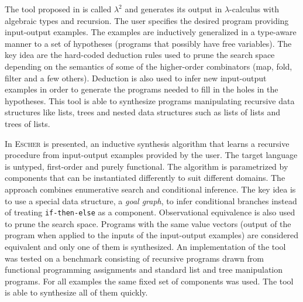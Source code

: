 The tool proposed in \cite{Feser:2015:SDS:2737924.2737977} is called $\lambda^2$ and generates its output in $\lambda$-calculus with algebraic types and recursion.
The user specifies the desired program providing input-output examples.  
The examples are inductively generalized in a type-aware manner to a set of hypotheses (programs that possibly have free variables).
The key idea are the hard-coded deduction rules used to prune the search space depending on the semantics of some of the higher-order combinators (map, fold, filter and a few others).
Deduction is also used to infer new input-output examples in order to generate the programs needed to fill in the holes in the hypotheses.
This tool is able to synthesize programs manipulating recursive data structures like lists, trees and nested data structures such as lists of lists and trees of lists.

In \cite{Albarghouthi:2013:RPS:2526861.2526942} \textsc{Escher} is presented, an inductive synthesis algorithm that learns a recursive procedure from input-output examples provided by the user.  The target language is untyped, first-order and purely functional.
The algorithm is parametrized by components that can be instantiated differently to suit different domains.
The approach combines enumerative search and conditional inference. The key idea is to use a special data structure, a \emph{goal graph}, to infer conditional branches instead of treating \texttt{if-then-else} as a component.
Observational equivalence is also used to prune the search space. Programs with the same value vectors (output of the program when applied to the inputs of the input-output examples) are considered equivalent and only one of them is synthesized.
An implementation of the tool was tested on a benchmark consisting of recursive programs  drawn from functional programming assignments and standard list and tree manipulation programs.
For all examples the same fixed set of components was used.
The tool is able to synthesize all of them quickly. 

